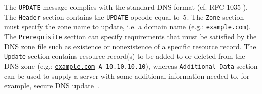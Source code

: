 The \texttt{UPDATE} message complies with the standard DNS %
format (cf. RFC 1035 \cite{rfc1035}).
The \texttt{Header} section contains the \texttt{UPDATE} opcode equal to~5. The \texttt{Zone} section must specify the zone name to update, i.e. a domain name (e.g.: \texttt{\url{example.com}}). The \texttt{Prerequisite} section can specify 
requirements %
that must be satisfied by the DNS zone file such as existence or nonexistence of a specific resource record. %
The \texttt{Update} section contains resource record(s) to be added to or deleted from the DNS zone (e.g.:  \texttt{\url{example.com} A 10.10.10.10}), whereas \texttt{Additional Data} section can be used to supply a server with some additional information needed to, for example,  secure DNS update~\cite{rfc2136}.

